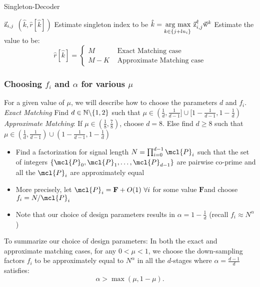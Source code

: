 \begin{algorithm}[h!]
\caption{Singleton-Decoder}
\label{Algo:SingletonDecoder}
\begin{algorithmic}
 $\vec{\mathrm{z}}_{i,j}$
\vspace{\gap}
 $(\hat{k},\hat{r}[\hat{k}])$
\vspace{\gap}
\State Estimate singleton index to be $ \hat{k} = \underset{k\in\{j+l n_i\}}{\operatorname*{\,arg\ max}}\  \vec{\mathrm{z}}^{\dagger}_{i,j} \vec{\mathrm{w}}^{k}$ 
\vspace{\gap}
  \State Estimate the value to be:$$ \hat{r}[\hat{k}]=
   \begin{cases}
   M & \text{ Exact Matching case}\\
  M-K & \text{ Approximate Matching case}
  \end{cases}
  $$
\end{algorithmic}
\end{algorithm}

\subsubsection{Choosing $f_i$ and $\alpha$ for various $\mu$}
\label{subsec:DesignParameters}
For a given value of $\mu$, we will describe how to choose the parameters $d$ and $f_i$.\\
 {\it Exact Matching} Find $d\in \mathbb{N}\backslash \{1,2\}$ such that $\mu\in(\frac{1}{d},\frac{1}{d-1}]\cup[1-\frac{1}{d-1},1-\frac{1}{d})$\\
{\it Approximate Matching}: If $\mu\in(\frac{1}{8},\frac{7}{8})$, choose $d=8$. Else find $d\geq 8$ such that $\mu\in(\frac{1}{d},\frac{1}{d-1})\cup(1-\frac{1}{d-1},1-\frac{1}{d})$
\begin{itemize}
\item Find a factorization for signal length $N=\prod_{i=0}^{d-1} \mcl{P}_i$ such that the set of integers $\{\mcl{P}_0,\mcl{P}_1,\ldots,\mcl{P}_{d-1}\}$ are pairwise co-prime and all the $\mcl{P}_i$ are approximately equal
\item More precisely, let $\mcl{P}_i=\mathbf{F}+O(1) ~\forall i$ for some value $\mathbf{F}$and choose $f_i=N/\mcl{P}_i$
\item Note that our choice of design parameters results in $\alpha=1-\frac{1}{d}$ (recall $f_i\approx N^{\alpha}$)
\end{itemize} 
To summarize our choice of design parameters: In both the exact and approximate matching cases, for any $0<\mu<1$, we choose the down-sampling factors $f_i$ to be approximately equal to $N^{\alpha}$ in all the $d$-stages where $\alpha=\frac{d-1}{d}$ satisfies:
\begin{equation}
\label{Eqn:IneqMuAlpha}
\alpha>\max(\mu,1-\mu).
\end{equation}

